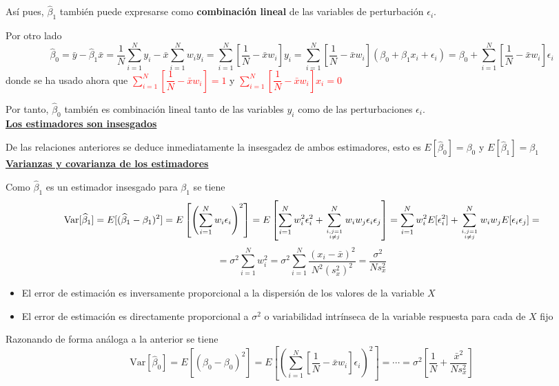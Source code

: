 \documentclass[10pt,a4paper]{book}
\begin{document}
Así pues, $\widehat{\beta}_1$ también puede expresarse como \textbf{combinación lineal} de las variables de perturbación $\epsilon_i$.

Por otro lado $$\widehat{\beta}_0=\bar{y}-\widehat{\beta}_1\bar{x}=\dfrac{1}{N}\sum^N_{i=1}y_i-\bar{x}\sum^N_{i=1}w_iy_i=\sum^N_{i=1}\left[\dfrac{1}{N}-\bar{x}w_i\right] y_i=\sum^N_{i=1}\left[\dfrac{1}{N}-\bar{x}w_i\right] (\beta_0+\beta_1x_i+\epsilon_i)=\beta_0+\sum^N_{i=1}\left[\dfrac{1}{N}-\bar{x}w_i\right]\epsilon_i$$ donde se ha usado ahora que \textcolor{red}{$\displaystyle\sum^N_{i=1}\left[\dfrac{1}{N}-\bar{x}w_i\right]=1$} y \textcolor{red}{$\displaystyle\sum^N_{i=1}\left[\dfrac{1}{N}-\bar{x}w_i\right]x_i=0$}

Por tanto, $\widehat{\beta}_0$ también es combinación lineal tanto de las variables $y_i$ como de las perturbaciones $\epsilon_i$.
\ \\

\underline{\textbf{Los estimadores son insesgados}}

De las relaciones anteriores se deduce inmediatamente la insesgadez de ambos estimadores, esto es $E[\widehat{\beta}_0]=\beta_0$ y $E[\widehat{\beta}_1]=\beta_1$
\ \\

\underline{\textbf{Varianzas y covarianza de los estimadores}}

Como $\widehat{\beta}_1$ es un estimador insesgado para $\beta_1$ se tiene $$\mathrm{Var}[\widehat{\beta}_1]=E[(\widehat{\beta}_1-\beta_1)^2]=E\left[\left(\sum^N_{i=1}w_i\epsilon_i \right) ^2\right] =E\left[\sum^N_{i=1}w^2_i\epsilon^2_i+\sum^N_{i,j=1\atop i\ne j}w_iw_j\epsilon_i\epsilon_j\right]=\sum^N_{i=1}w_i^2E[\epsilon^2_i]+\sum^N_{i,j=1\atop i\ne j}w_iw_jE[\epsilon_i\epsilon_j]=$$$$=\sigma^2\sum^N_{i=1}w^2_i=\sigma^2\sum^N_{i=1}\dfrac{(x_i-\bar{x})^2}{N^2(s^2_x)^2}=\dfrac{\sigma^2}{Ns^2_x}$$

\begin{itemize}
\item El error de estimación es inversamente proporcional a la dispersión de los valores de la variable $X$
\item El error de estimación es directamente proporcional a $\sigma^2$ o variabilidad intrínseca de la variable respuesta para cada de $X$ fijo
\end{itemize}

Razonando de forma análoga a la anterior se tiene $$\mathrm{Var}[\widehat{\beta}_0]=E[(\widehat{\beta}_0-\beta_0)^2]=E\left[\left(\sum^N_{i=1}\left[\dfrac{1}{N}-\bar{x}w_i\right]\epsilon_i\right)^2\right]=\cdots=\sigma^2\left[\dfrac{1}{N}+\dfrac{\bar{x}^2}{Ns^2_x}\right]$$
\end{document}
